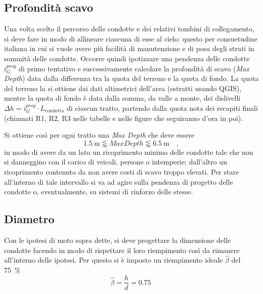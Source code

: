 \subsection{Profondità scavo}
Una volta scelto il percorso delle condotte e dei relativi tombini di collegamento, si deve fare in modo di allineare ciascuna di esse al cielo: 
questo per consuetudine italiana in cui si vuole avere più facilità di manutenzione e di posa degli strati in sommità delle condotte. 
Occorre quindi ipotizzare una pendenza delle condotte $i_G^{prog}$ di primo tentativo e successivamente calcolare la profondità di scavo (\emph{Max Depth}) data dalla differenza tra la quota del terreno e la quota di fondo.
La quota del terreno la si ottiene dai dati altimetrici dell'area (estratti usando QGIS), mentre la quota di fondo è data dalla somma, da valle a monte, dei dislivelli $\Delta h = i_G^{prog} \cdot L_{\text{condotta}}$ di ciascun tratto, partendo dalla quota nota dei recapiti finali (chiamati R1, R2, R3 nelle tabelle e nelle figure che seguiranno d'ora in poi).

Si ottiene così per ogni tratto una \emph{Max Depth} che deve essere
\begin{equation}
    \SI{1.5}{\metre} \lessapprox Max Depth \lessapprox\SI{6.5}{\metre}\quad ,
\end{equation} 
in modo di avere da un lato un ricoprimento minimo delle condotte tale che non si danneggino con il carico di veicoli, persone o intemperie;  dall'altro un ricoprimento contenuto da non avere costi di scavo troppo elevati. 
Per stare all'interno di tale intervallo si va ad agire sulla pendenza di progetto delle condotte o, eventualmente, su sistemi di rinforzo delle stesse.
\subsection{Diametro}
Con le ipotesi di moto sopra dette, si deve progettare la dimensione delle condotte facendo in modo di rispettare il loro riempimento così da rimanere all'interno delle ipotesi. 
Per questo si è imposto un riempimento ideale $\hat{\beta}$ del \SI{75}{\percent}
\begin{equation}
    \hat{\beta} = \frac{h}{d} = \SI{0.75}{}
\end{equation}

